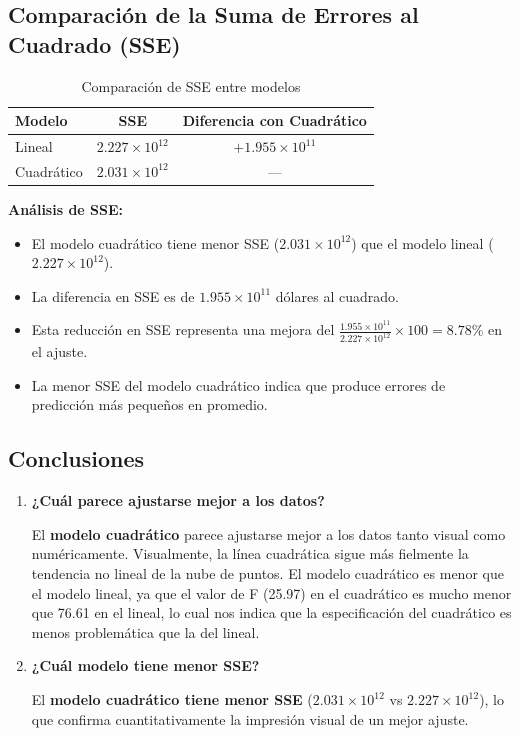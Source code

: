 \documentclass[12pt]{article}
\begin{document}
\subsection*{Comparación de la Suma de Errores al Cuadrado (SSE)}

\begin{table}[h]
\centering
\begin{tabular}{lcc}
\hline
\textbf{Modelo} & \textbf{SSE} & \textbf{Diferencia con Cuadrático} \\
\hline
Lineal & $2.227 \times 10^{12}$ & $+1.955 \times 10^{11}$ \\
Cuadrático & $2.031 \times 10^{12}$ & --- \\
\hline
\end{tabular}
\caption{Comparación de SSE entre modelos}
\label{tab:sse_comparison}
\end{table}

\textbf{Análisis de SSE:}
\begin{itemize}
    \item El modelo cuadrático tiene menor SSE ($2.031 \times 10^{12}$) que el modelo lineal ($2.227 \times 10^{12}$).
    \item La diferencia en SSE es de $1.955 \times 10^{11}$ dólares al cuadrado.
    \item Esta reducción en SSE representa una mejora del $\frac{1.955 \times 10^{11}}{2.227 \times 10^{12}} \times 100 = 8.78\%$ en el ajuste.
    \item La menor SSE del modelo cuadrático indica que produce errores de predicción más pequeños en promedio.
\end{itemize}

\subsection*{Conclusiones}

\begin{enumerate}
    \item \textbf{¿Cuál parece ajustarse mejor a los datos?}
    
    El \textbf{modelo cuadrático} parece ajustarse mejor a los datos tanto visual como numéricamente. Visualmente, la línea cuadrática sigue más fielmente la tendencia no lineal de la nube de puntos. 
    El modelo cuadrático es menor que el modelo lineal, ya que el valor de F (25.97) en el cuadrático es mucho menor que 76.61 en el lineal, lo cual nos indica que la especificación del cuadrático es menos problemática que la del lineal.
    
    \item \textbf{¿Cuál modelo tiene menor SSE?}
    
    El \textbf{modelo cuadrático tiene menor SSE} ($2.031 \times 10^{12}$ vs $2.227 \times 10^{12}$), lo que confirma cuantitativamente la impresión visual de un mejor ajuste.
    
\end{enumerate}
\end{document}
